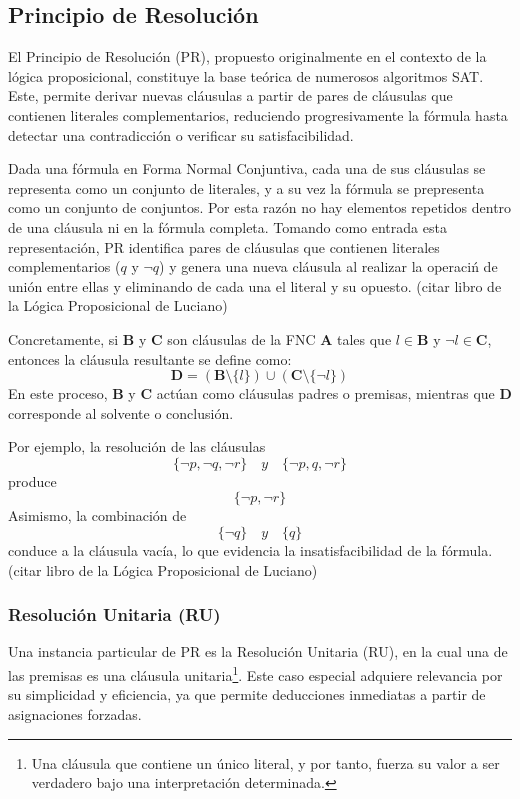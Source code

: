 \subsection{Principio de Resolución}
\label{subsec:prncp-de-res}
El Principio de Resolución (PR), propuesto originalmente en el contexto de la lógica proposicional, constituye la base teórica de numerosos algoritmos SAT. Este, permite derivar nuevas cláusulas a partir de pares de cláusulas que contienen literales complementarios, reduciendo progresivamente la fórmula hasta detectar una contradicción o verificar su satisfacibilidad. 

Dada una fórmula en Forma Normal Conjuntiva, cada una de sus cláusulas se representa como un conjunto de literales, y a su vez la f\'ormula se prepresenta como un conjunto de conjuntos. Por esta raz\'on no hay elementos repetidos dentro de una cláusula ni en la fórmula completa. Tomando como entrada esta representación, PR identifica pares de cláusulas que contienen literales complementarios ($q$ y $\neg q$) y genera una nueva cláusula al realizar la operaci\'n de uni\'on entre ellas y eliminando de cada una el literal y su opuesto. (citar libro de la L\'ogica Proposicional de Luciano)

Concretamente, si \(\mathbf{B}\) y \(\mathbf{C}\) son cláusulas de la FNC \(\mathbf{A}\) tales que \(l\in\mathbf{B}\) y \(\neg l\in\mathbf{C}\), entonces la cláusula resultante se define como:
\[
\mathbf{D}=(\mathbf{B}\setminus\{l\})\cup(\mathbf{C}\setminus\{\neg l\})
\]
En este proceso, \(\mathbf{B}\) y \(\mathbf{C}\) actúan como cláusulas padres o premisas, mientras que \(\mathbf{D}\) corresponde al solvente o conclusión.

Por ejemplo, la resolución de las cláusulas
\[
\{\neg p,\neg q,\neg r\}\quad y\quad\{\neg p,q,\neg r\}
\]
produce
\[
\{\neg p,\neg r\}
\]
Asimismo, la combinación de
\[
\{\neg q\}\quad y\quad\{q\}
\]
conduce a la cláusula vacía, lo que evidencia la insatisfacibilidad de la fórmula. (citar libro de la L\'ogica Proposicional de Luciano)

\subsubsection{Resoluci\'on Unitaria (RU)}
\label{subsubsec:res-unit}
Una instancia particular de PR es la Resoluci\'on Unitaria (RU), en la cual una de las premisas es una cl\'ausula unitaria\footnote{Una cl\'ausula que contiene un \'unico literal, y por tanto, fuerza su valor a ser verdadero bajo una interpretaci\'on determinada.}. Este caso especial adquiere relevancia por su simplicidad y eficiencia, ya que permite deducciones inmediatas a partir de asignaciones forzadas.

